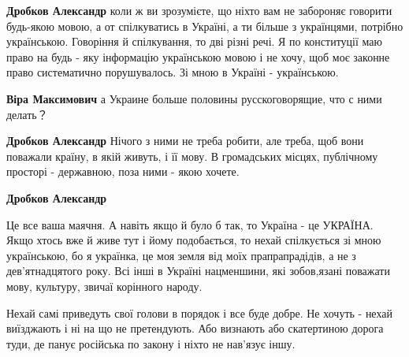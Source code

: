 \begin{itemize}
\begin{itemize}
\textbf{Дробков Александр} коли ж ви зрозумієте, що ніхто вам не забороняє говорити будь-якою мовою, а от спілкуватись в Україні, а ти більше з українцями, потрібно українською. Говоріння й спілкування, то дві різні речі. Я по конституції маю право на будь - яку інформацію українською мовою і не хочу, щоб моє законне право систематично порушувалось.
Зі мною в Україні - українською.

 
\textbf{Віра Максимович} а Украине больше половины русскоговорящие, что с ними делать？

 
\textbf{Дробков Александр} Нічого з ними не треба робити, але треба, щоб вони поважали країну, в якій живуть, і її мову. В громадських місцях, публічному просторі - державною, поза ними - якою хочете.

 
\textbf{Дробков Александр} 

Це все ваша маячня. А навіть якщо й було б так, то Україна - це УКРАЇНА. Якщо
хтось вже й живе тут і йому подобається, то нехай спілкується зі мною
українською, бо я українка, це моя земля від моїх прапрапрадідів, а не з
дев'ятнадцятого року. Всі інші в Україні нацменшини, які зобов,язані поважати
мову, культуру, звичаї корінного народу.

Нехай самі приведуть свої голови в порядок і все буде добре. Не хочуть - нехай
виїзджають і ні на що не претендують. Або визнають або скатертиною дорога туди,
де панує російська по закону і ніхто не нав'язує іншу.


 

\end{itemize}
\end{itemize}
